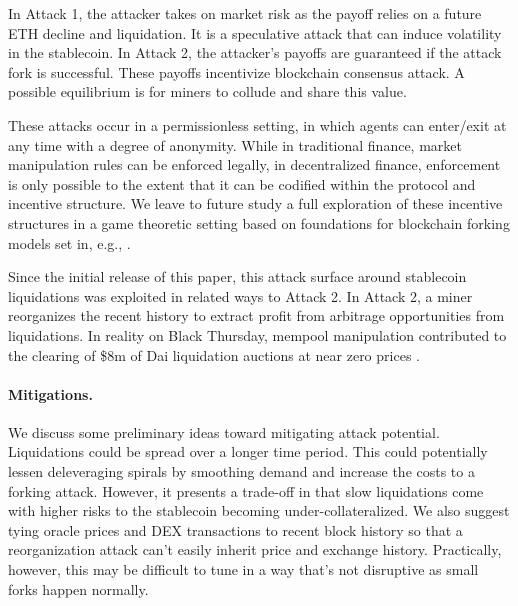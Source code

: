 \vspace{0.3cm}
In Attack 1, the attacker takes on market risk as the payoff relies on a future ETH decline and liquidation. It is a speculative attack that can induce volatility in the stablecoin. In Attack 2, the attacker's payoffs are guaranteed if the attack fork is successful. These payoffs incentivize blockchain consensus attack. A possible equilibrium is for miners to collude and share this value.

These attacks occur in a permissionless setting, in which agents can enter/exit at any time with a degree of anonymity. While in traditional finance, market manipulation rules can be enforced legally, in decentralized finance, enforcement is only possible to the extent that it can be codified within the protocol and incentive structure. We leave to future study a full exploration of these incentive structures in a game theoretic setting based on foundations for blockchain forking models set in, e.g., \cite{biais2018}.

Since the initial release of this paper, this attack surface around stablecoin liquidations was exploited in related ways to Attack 2. In Attack 2, a miner reorganizes the recent history to extract profit from arbitrage opportunities from liquidations. In reality on Black Thursday, mempool manipulation contributed to the clearing of \$8m of Dai liquidation auctions at near zero prices \cite{blocknative2020}.

\paragraph{Mitigations.} We discuss some preliminary ideas toward mitigating attack potential. Liquidations could be spread over a longer time period. This could potentially lessen deleveraging spirals by smoothing demand and increase the costs to a forking attack. However, it presents a trade-off in that slow liquidations come with higher risks to the stablecoin becoming under-collateralized. We also suggest tying oracle prices and DEX transactions to recent block history so that a reorganization attack can't easily inherit price and exchange history. Practically, however, this may be difficult to tune in a way that's not disruptive as small forks happen normally.